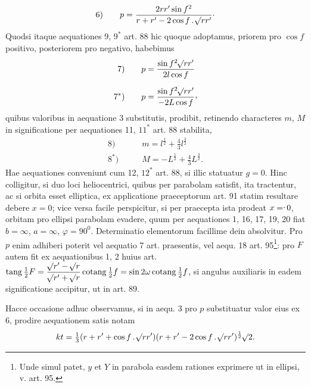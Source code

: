 \[
\mathrm{6)}\qquad p=\frac{2rr'\sin f^2}{r+r'-2\cos f\,\mathpunct{.}\mathord{{}^{}\!\surd}rr'}\mathpunct{\cdot}
\]
\noindent Quodsi itaque aequationes 9, $9^*$ art. 88 hic quoque adoptamus, priorem pro $\cos f$ positivo, posteriorem pro negativo, habebimus
\[
\begin{aligned}
\mathrm{7)}\qquad&p=\frac{\sin f^2\BareRoot{rr'}}{2l\cos f}\\[.6em]
\mathrm{7^*)}\qquad&p=\frac{\sin f^2\BareRoot{rr'}}{-2L\cos f}\mathpunct{\raisebox{.45ex}{,}}
\end{aligned}
\]
\noindent quibus valoribus in aequatione 3 substitutis, prodibit, retinendo characteres $m$, $M$ in significatione per aequationes 11, $11^*$ art. 88 stabilita,
\[
\begin{aligned}
\mathrm{8)}\qquad&m=l^{\frac12}+\tfrac43l^{\frac32}\\[.5em]
\mathrm{8^*)}\qquad&M=-L^{\frac12}+\tfrac43L^{\frac32}.
\end{aligned}
\]
\noindent Hae aequationes conveniunt cum 12, $12^*$ art. 88, si illic statuatur $g=0$. Hinc colligitur, si duo loci heliocentrici, quibus per parabolam satisfit, ita tractentur, ac si orbita esset elliptica, ex applicatione praeceptorum art. 91 statim resultare debere $x=0$; vice versa facile perspicitur, si per praecepta ista prodeat $x=\mathpunct{\raisebox{.65ex}{.}}0$, orbitam pro ellipsi parabolam evadere, quum per aequationes 1, 16, 17, 19, 20 fiat $b=\infty$, $a=\infty$, $\varphi=90^0$. Determinatio elementorum facillime dein absolvitur. Pro $p$ enim adhiberi poterit vel aequatio 7 art. praesentis, vel aequ. 18 art. 95\footnote{Unde simul patet, $y$ et $Y$ in parabola easdem rationes exprimere ut in ellipsi, v. art. 95.}: pro $F$ autem fit ex aequationibus 1, 2 huius art. $\operatorname{tang}\tfrac12 F=\dfrac{\mathord{{}^{}\!\surd}r'-\mathord{{}^{}\!\surd}r}{\mathord{{}^{}\!\surd}r'+\mathord{{}^{}\!\surd}r}\operatorname{cotang}\tfrac12 f=\sin2\omega\operatorname{cotang}\tfrac12 f$, si angulus auxiliaris in eadem significatione accipitur, ut in art. 89.

Hacce occasione adhuc observamus, si in aequ. 3 pro $p$ substituatur valor eius ex 6, prodire aequationem satis notam
\[
kt=\tfrac13(r+r'+\cos f\,\mathpunct{.}\mathord{{}^{}\!\surd}rr')(r+r'-2\cos f\,\mathpunct{.}\mathord{{}^{}\!\surd}rr')^{\frac12}\mathord{{}^{}\!\surd}2.
\]
